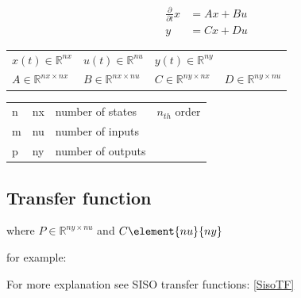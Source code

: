 \documentclass[10pt,a4paper]{scrartcl}
\begin{document}
\begin{multicols*}{3}
	\begin{align*}
	\frac{\partial}{\partial t}x&=Ax+Bu\\
	y&=Cx+Du
	\end{align*}
	
	\begin{tabular}{llll}
	$x(t)\in\mathbb{R}^{nx}$&$u(t)\in\mathbb{R}^{nu}$&$y(t)\in\mathbb{R}^{ny}$\\
	$A\in\mathbb{R}^{nx\times nx}$&$B\in\mathbb{R}^{nx\times nu}$&$C\in\mathbb{R}^{ny\times nx}$&$D\in\mathbb{R}^{ny\times nu}$
	\end{tabular}
	
	\begin{tabular}{l@{  =  }lll}
	n&nx&number of states&$n_{th}$ order\\
	m&nu&number of inputs\\
	p&ny&number of outputs\\
	\end{tabular}
	
	\finn
	
	
	
	\subsection{Transfer function}
	
	
	where $P\in\mathbb{R}^{ny\times nu}$ and $C\element{nu}{ny}$
	
	for example:
	
	
	
	For more explanation see SISO transfer functions: \ref{SisoTF}
	

\end{multicols*}
\end{document}
